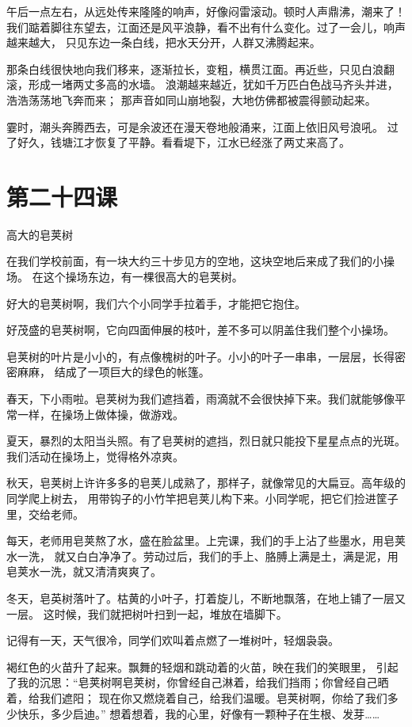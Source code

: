 \documentclass[12pt,UTF8]{ctexbook}
\begin{document}
午后一点左右，从远处传来隆隆的响声，好像闷雷滚动。顿时人声鼎沸，潮来了！
我们踮着脚往东望去，江面还是风平浪静，看不出有什么变化。过了一会儿，响声越来越大，
只见东边一条白线，把水天分开，人群又沸腾起来。

那条白线很快地向我们移来，逐渐拉长，变粗，横贯江面。再近些，只见白浪翻滚，形成一堵两丈多高的水墙。
浪潮越来越近，犹如千万匹白色战马齐头并进，浩浩荡荡地飞奔而来；
那声音如同山崩地裂，大地仿佛都被震得颤动起来。

霎时，潮头奔腾西去，可是余波还在漫天卷地般涌来，江面上依旧风号浪吼。
过了好久，钱塘江才恢复了平静。看看堤下，江水已经涨了两丈来高了。

\section{第二十四课}

高大的皂荚树


在我们学校前面，有一块大约三十步见方的空地，这块空地后来成了我们的小操场。
在这个操场东边，有一棵很高大的皂荚树。

好大的皂荚树啊，我们六个小同学手拉着手，才能把它抱住。

好茂盛的皂荚树啊，它向四面伸展的枝叶，差不多可以阴盖住我们整个小操场。

皂荚树的叶片是小小的，有点像槐树的叶子。小小的叶子一串串，一层层，长得密密麻麻，
结成了一项巨大的绿色的帐篷。

春天，下小雨啦。皂荚树为我们遮挡着，雨滴就不会很快掉下来。我们就能够像平常一样，在操场上做体操，做游戏。

夏天，暴烈的太阳当头照。有了皂荚树的遮挡，烈日就只能投下星星点点的光斑。我们活动在操场上，觉得格外凉爽。

秋天，皂荚树上许许多多的皂荚儿成熟了，那样子，就像常见的大扁豆。高年级的同学爬上树去，
用带钩子的小竹竿把皂荚儿构下来。小同学呢，把它们捡进筐子里，交给老师。

每天，老师用皂荚熬了水，盛在脸盆里。上完课，我们的手上沾了些墨水，用皂荚水一洗，
就又白白净净了。劳动过后，我们的手上、胳膊上满是土，满是泥，用皂荚水一洗，就又清清爽爽了。

冬天，皂英树落叶了。枯黄的小叶子，打着旋儿，不断地飘落，在地上铺了一层又一层。
这时候，我们就把树叶扫到一起，堆放在墙脚下。

记得有一天，天气很冷，同学们欢叫着点燃了一堆树叶，轻烟袅袅。

褐红色的火苗升了起来。飘舞的轻烟和跳动着的火苗，映在我们的笑眼里，
引起了我的沉思：“皂荚树啊皂荚树，你曾经自己淋着，给我们挡雨；你曾经自己晒着，给我们遮阳；
现在你又燃烧着自己，给我们温暖。皂荚树啊，你给了我们多少快乐，多少启迪。”
想着想着，我的心里，好像有一颗种子在生根、发芽……
\end{document}
